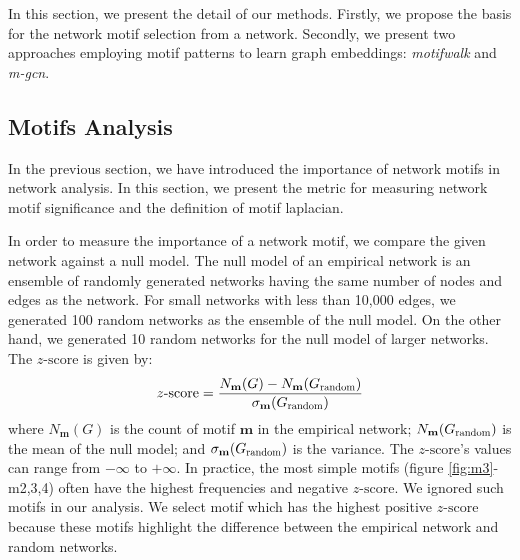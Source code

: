 \documentclass{article}
\theoremstyle{definition}
\begin{document}
In this section, we present the detail of our methods. Firstly,
we propose the basis for the network motif selection from a network.
Secondly, we present two approaches employing motif patterns to
learn graph embeddings: \emph{motifwalk} and \emph{m-gcn}.

\subsection{Motifs Analysis}

In the previous section, we have introduced the importance of
network motifs in network analysis. In this section, we present
the metric for measuring network motif significance and the definition
of motif laplacian.

In order to measure the importance of a network motif, we compare
the given network against a null model. The null model of an empirical 
network is an ensemble of randomly generated networks having the same 
number of nodes and edges as the network. For small networks with less 
than 10,000 edges, we generated 100 random networks as the ensemble of the 
null model. On the other hand, we generated 10 random networks for the 
null model of larger networks. The $z\mbox{-score}$ is given by:
\begin{equation*}
z\mbox{-score} = \frac{N_\mathbf{m}(G)-N_\mathbf{m}(G_{\scalebox{0.75}{random}})}{\sigma_\mathbf{m}(G_{\scalebox{0.75}{random}})}
\end{equation*}
where $N_\mathbf{m}(G)$ is the count of motif $\mathbf{m}$ in the 
empirical network; $N_\mathbf{m}(G_{\scalebox{0.75}{random}})$ is the mean 
of the null model; and $\sigma_\mathbf{m}(G_{\scalebox{0.75}{random}})$ is
the variance. The $z\mbox{-score}$'s values can range from 
$-\infty$ to $+\infty$. In practice, the most simple motifs (figure 
\ref{fig:m3}-m2,3,4) often have the highest frequencies and negative $z
\mbox{-score}$. We ignored such motifs in our analysis. We select motif 
which has the highest positive $z\mbox{-score}$ because these motifs
highlight the difference between the empirical network and random 
networks. 
\end{document}
